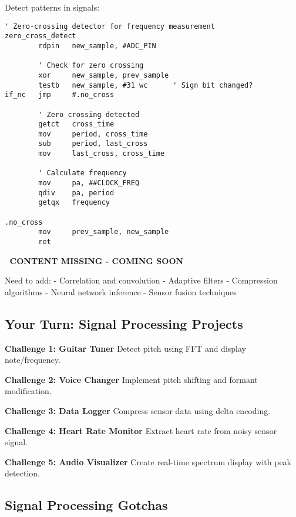 \documentclass[11pt]{book}
\begin{document}
Detect patterns in signals:

\begin{lstlisting}
' Zero-crossing detector for frequency measurement
zero_cross_detect
        rdpin   new_sample, #ADC_PIN
        
        ' Check for zero crossing
        xor     new_sample, prev_sample
        testb   new_sample, #31 wc      ' Sign bit changed?
if_nc   jmp     #.no_cross
        
        ' Zero crossing detected
        getct   cross_time
        mov     period, cross_time
        sub     period, last_cross
        mov     last_cross, cross_time
        
        ' Calculate frequency
        mov     pa, ##CLOCK_FREQ
        qdiv    pa, period
        getqx   frequency
        
.no_cross
        mov     prev_sample, new_sample
        ret
\end{lstlisting}

\begin{missing}
🚧 \textbf{CONTENT MISSING - COMING SOON}

Need to add:
- Correlation and convolution
- Adaptive filters
- Compression algorithms
- Neural network inference
- Sensor fusion techniques
\end{missing}

\hypertarget{your-turn-signal-processing-projects}{%
\subsection{Your Turn: Signal Processing
Projects}\label{your-turn-signal-processing-projects}}

\begin{yourturn}
\textbf{Challenge 1: Guitar Tuner}
Detect pitch using FFT and display note/frequency.

\textbf{Challenge 2: Voice Changer}
Implement pitch shifting and formant modification.

\textbf{Challenge 3: Data Logger}
Compress sensor data using delta encoding.

\textbf{Challenge 4: Heart Rate Monitor}
Extract heart rate from noisy sensor signal.

\textbf{Challenge 5: Audio Visualizer}
Create real-time spectrum display with peak detection.
\end{yourturn}

\hypertarget{signal-processing-gotchas}{%
\subsection{Signal Processing Gotchas}\label{signal-processing-gotchas}}
\end{document}
